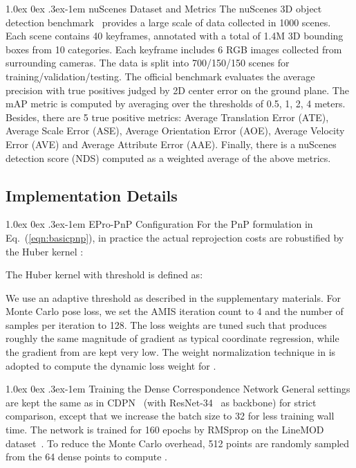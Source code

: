 \documentclass[10pt,twocolumn,letterpaper]{article}
\makeatletter
\renewcommand{\paragraph}{
  \@startsection{paragraph}{4}
  {\z@}{1.0ex \@plus 0ex \@minus .3ex}{-1em}
  {\normalfont\normalsize\bfseries}
}
\makeatother
\begin{document}
\paragraph{nuScenes Dataset and Metrics}
The nuScenes 3D object detection benchmark~\cite{nuscenes} provides a large scale of data collected in 1000 scenes.
Each scene contains 40 keyframes, annotated with a total of 1.4M 3D bounding boxes from 10 categories.
Each keyframe includes 6 RGB images collected from surrounding cameras. The data is split into 700/150/150 scenes for training/validation/testing. The official benchmark evaluates the average precision with true positives judged by 2D center error on the ground plane.
The mAP metric is computed by averaging over the thresholds of 0.5, 1, 2, 4 meters. Besides, there are 5 true positive metrics: Average Translation Error (ATE),
Average Scale Error (ASE),
Average Orientation Error (AOE),
Average Velocity Error (AVE)
and Average Attribute Error (AAE).
Finally, there is a nuScenes detection score (NDS) computed as a weighted average of the above metrics. 

\subsection{Implementation Details} \label{implementation}
\paragraph{EPro-PnP Configuration} For the PnP formulation in Eq.~(\ref{eqn:basicpnp}), in practice the actual reprojection costs are robustified by the Huber kernel :

The Huber kernel with threshold  is defined as:

We use an adaptive threshold as described in the supplementary materials.
For Monte Carlo pose loss, we set the AMIS iteration count  to 4 and the number of samples per iteration  to 128. The loss weights are tuned such that  produces roughly the same magnitude of gradient as typical coordinate regression, while the gradient from  are kept very low. The weight normalization technique in \cite{monorun} is adopted to compute the dynamic loss weight for .


\paragraph{Training the Dense Correspondence Network} 
General settings are kept the same as in CDPN~\cite{CDPN} (with ResNet-34~\cite{resnet} as backbone) for strict comparison, except that we increase the batch size to 32 for less training wall time.
The network is trained for 160 epochs by RMSprop on the LineMOD dataset~\cite{linemod}. To reduce the Monte Carlo overhead, 512 points are randomly sampled from the 64 dense points to compute .
\end{document}
